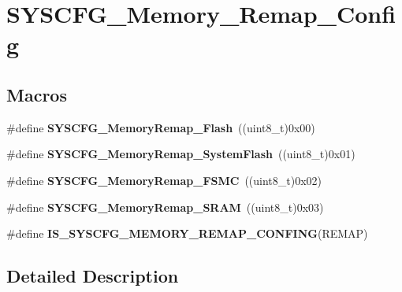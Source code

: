 \hypertarget{group___s_y_s_c_f_g___memory___remap___config}{\section{S\-Y\-S\-C\-F\-G\-\_\-\-Memory\-\_\-\-Remap\-\_\-\-Config}
\label{group___s_y_s_c_f_g___memory___remap___config}
}
\subsection*{Macros}
\begin{DoxyCompactItemize}
\item 
\hypertarget{group___s_y_s_c_f_g___memory___remap___config_gaca6b4b48448ddf67fdaa37412a0202ff}{\#define {\bfseries S\-Y\-S\-C\-F\-G\-\_\-\-Memory\-Remap\-\_\-\-Flash}~((uint8\-\_\-t)0x00)}\label{group___s_y_s_c_f_g___memory___remap___config_gaca6b4b48448ddf67fdaa37412a0202ff}

\item 
\hypertarget{group___s_y_s_c_f_g___memory___remap___config_gadabfec4d205f0a25ede0e6ee8ebfcfab}{\#define {\bfseries S\-Y\-S\-C\-F\-G\-\_\-\-Memory\-Remap\-\_\-\-System\-Flash}~((uint8\-\_\-t)0x01)}\label{group___s_y_s_c_f_g___memory___remap___config_gadabfec4d205f0a25ede0e6ee8ebfcfab}

\item 
\hypertarget{group___s_y_s_c_f_g___memory___remap___config_ga7ed56d4bd566e0d97cce3962461673cf}{\#define {\bfseries S\-Y\-S\-C\-F\-G\-\_\-\-Memory\-Remap\-\_\-\-F\-S\-M\-C}~((uint8\-\_\-t)0x02)}\label{group___s_y_s_c_f_g___memory___remap___config_ga7ed56d4bd566e0d97cce3962461673cf}

\item 
\hypertarget{group___s_y_s_c_f_g___memory___remap___config_ga3dc9c7f02f9457d344ffe377df125ee2}{\#define {\bfseries S\-Y\-S\-C\-F\-G\-\_\-\-Memory\-Remap\-\_\-\-S\-R\-A\-M}~((uint8\-\_\-t)0x03)}\label{group___s_y_s_c_f_g___memory___remap___config_ga3dc9c7f02f9457d344ffe377df125ee2}

\item 
\#define {\bfseries I\-S\-\_\-\-S\-Y\-S\-C\-F\-G\-\_\-\-M\-E\-M\-O\-R\-Y\-\_\-\-R\-E\-M\-A\-P\-\_\-\-C\-O\-N\-F\-I\-N\-G}(R\-E\-M\-A\-P)
\end{DoxyCompactItemize}


\subsection{Detailed Description}


